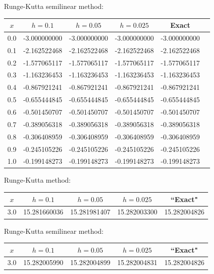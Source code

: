 \hspace{.75in}
{\small Runge-Kutta semilinear method:
\begin{tabular}{|c|r|r|r|r|r|}
\hline
\multicolumn{1}{|c|}{$x$}&
\multicolumn{1}{|c|}{$h=0.1$}&
\multicolumn{1}{|c|}{$h=0.05$}&
\multicolumn{1}{|c|}{$h=0.025$}&
\multicolumn{1}{|c|}{Exact}\\ \hline
0.0 & -3.000000000 & -3.000000000 & -3.000000000 & -3.000000000 \\
0.1 & -2.162522468 & -2.162522468 & -2.162522468 & -2.162522468 \\
0.2 & -1.577065117 & -1.577065117 & -1.577065117 & -1.577065117 \\
0.3 & -1.163236453 & -1.163236453 & -1.163236453 & -1.163236453 \\
0.4 & -0.867921241 & -0.867921241 & -0.867921241 & -0.867921241 \\
0.5 & -0.655444845 & -0.655444845 & -0.655444845 & -0.655444845 \\
0.6 & -0.501450707 & -0.501450707 & -0.501450707 & -0.501450707 \\
0.7 & -0.389056318 & -0.389056318 & -0.389056318 & -0.389056318 \\
0.8 & -0.306408959 & -0.306408959 & -0.306408959 & -0.306408959 \\
0.9 & -0.245105226 & -0.245105226 & -0.245105226 & -0.245105226 \\
1.0 & -0.199148273 & -0.199148273 & -0.199148273 & -0.199148273 \\
\hline
\end{tabular}}\bigskip

{\small Runge-Kutta method:
\begin{tabular}{|c|r|r|r|r|}
\hline
\multicolumn{1}{|c|}{$x$}&
\multicolumn{1}{|c|}{$h=0.1$}&
\multicolumn{1}{|c|}{$h=0.05$}&
\multicolumn{1}{|c|}{$h=0.025$}&
\multicolumn{1}{|c|}{``Exact"}\\ \hline
3.0 & 15.281660036 & 15.281981407 & 15.282003300 & 15.282004826 \\
 \hline
\end{tabular}}\bigskip



\hspace{.75in}
{\small Runge-Kutta semilinear method:
\begin{tabular}{|c|r|r|r|r|}
\hline
\multicolumn{1}{|c|}{$x$}&
\multicolumn{1}{|c|}{$h=0.1$}&
\multicolumn{1}{|c|}{$h=0.05$}&
\multicolumn{1}{|c|}{$h=0.025$}&
\multicolumn{1}{|c|}{``Exact"}\\ \hline
3.0 & 15.282005990 & 15.282004899 & 15.282004831 & 15.282004826 \\
\hline
\end{tabular}}\bigskip


